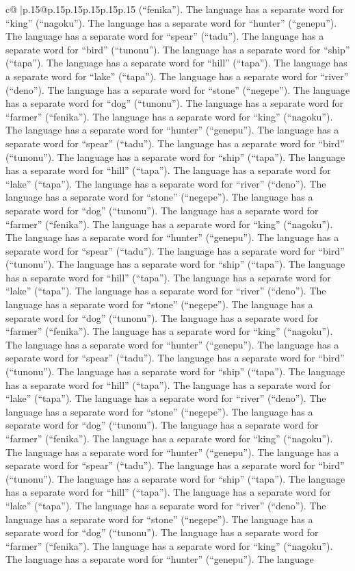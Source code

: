 \documentclass{article}
\begin{document}
{\begin{supertabular}{c@{$\;$}|p{.15\linewidth}@{}p{.15\linewidth}p{.15\linewidth}p{.15\linewidth}p{.15\linewidth}p{.15\linewidth}}
{{{(“fenika”). The language has a separate word for “king” (“nagoku”). The language has a separate word for “hunter” (“genepu”). The language has a separate word for “spear” (“tadu”). The language has a separate word for “bird” (“tunonu”). The language has a separate word for “ship” (“tapa”). The language has a separate word for “hill” (“tapa”). The language has a separate word for “lake” (“tapa”). The language has a separate word for “river” (“deno”). The language has a separate word for “stone” (“negepe”). The language has a separate word for “dog” (“tunonu”). The language has a separate word for “farmer” (“fenika”). The language has a separate word for “king” (“nagoku”). The language has a separate word for “hunter” (“genepu”). The language has a separate word for “spear” (“tadu”). The language has a separate word for “bird” (“tunonu”). The language has a separate word for “ship” (“tapa”). The language has a separate word for “hill” (“tapa”). The language has a separate word for “lake” (“tapa”). The language has a separate word for “river” (“deno”). The language has a separate word for “stone” (“negepe”). The language has a separate word for “dog” (“tunonu”). The language has a separate word for “farmer” (“fenika”). The language has a separate word for “king” (“nagoku”). The language has a separate word for “hunter” (“genepu”). The language has a separate word for “spear” (“tadu”). The language has a separate word for “bird” (“tunonu”). The language has a separate word for “ship” (“tapa”). The language has a separate word for “hill” (“tapa”). The language has a separate word for “lake” (“tapa”). The language has a separate word for “river” (“deno”). The language has a separate word for “stone” (“negepe”). The language has a separate word for “dog” (“tunonu”). The language has a separate word for “farmer” (“fenika”). The language has a separate word for “king” (“nagoku”). The language has a separate word for “hunter” (“genepu”). The language has a separate word for “spear” (“tadu”). The language has a separate word for “bird” (“tunonu”). The language has a separate word for “ship” (“tapa”). The language has a separate word for “hill” (“tapa”). The language has a separate word for “lake” (“tapa”). The language has a separate word for “river” (“deno”). The language has a separate word for “stone” (“negepe”). The language has a separate word for “dog” (“tunonu”). The language has a separate word for “farmer” (“fenika”). The language has a separate word for “king” (“nagoku”). The language has a separate word for “hunter” (“genepu”). The language has a separate word for “spear” (“tadu”). The language has a separate word for “bird” (“tunonu”). The language has a separate word for “ship” (“tapa”). The language has a separate word for “hill” (“tapa”). The language has a separate word for “lake” (“tapa”). The language has a separate word for “river” (“deno”). The language has a separate word for “stone” (“negepe”). The language has a separate word for “dog” (“tunonu”). The language has a separate word for “farmer” (“fenika”). The language has a separate word for “king” (“nagoku”). The language has a separate word for “hunter” (“genepu”). The language }}}
\end{supertabular}}
\end{document}
